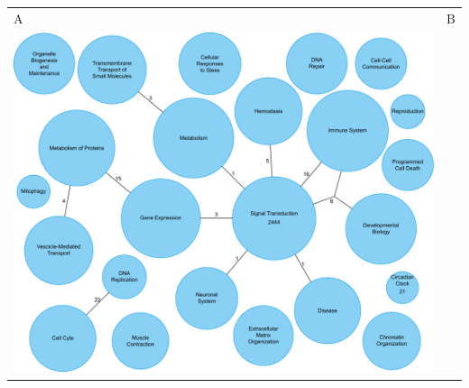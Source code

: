 \documentclass{article}
\begin{document}
\begin{tabular}{l@{}l}
  \large{A}&\hspace{1.25em}\large{B}\\
  \hspace{-0.25em}\includegraphics[scale=0.47]{Figure4a.pdf}&%
  \hspace{0.1em}%

\end{tabular}
\end{document}
